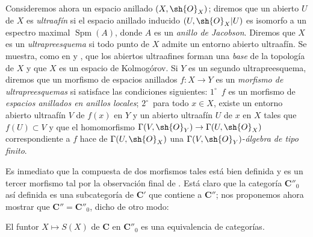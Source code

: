 
\begin{env}[10.9.5]
\label{IV.10.9.5}
Consideremos ahora un espacio anillado $(X,\sh{O}_X)$; diremos que un abierto $U$ de $X$ es \emph{ultraafín} si el espacio anillado inducido $(U,\sh{O}_X|U)$ es isomorfo a un espectro maximal $\operatorname{Spm}(A)$, donde $A$ es un \emph{anillo de Jacobson}.
Diremos que $X$ es un \emph{ultrapreesquema} si todo punto de $X$ admite un entorno abierto ultraafín.
Se muestra, como en  y , que los abiertos ultraafines forman una \emph{base} de la topología de $X$ y que $X$ es un espacio de Kolmogórov.
Si $Y$ es un segundo ultrapreesquema, diremos que un morfismo de espacios anillados $f:X\to Y$ es un \emph{morfismo de ultrapreesquemas} si satisface las condiciones siguientes: $1^\circ$~$f$ es un morfismo de \emph{espacios anillados en anillos locales}; $2^\circ$~para todo $x\in X$, existe un entorno abierto ultraafín $V$ de $f(x)$ en $Y$ y un abierto ultraafín $U$ de $x$ en $X$ tales que $f(U)\subset V$ y que el homomorfismo $\Gamma(V,\sh{O}_Y)\to\Gamma(U,\sh{O}_X)$ correspondiente a $f$ hace de $\Gamma(U,\sh{O}_X)$ una $\Gamma(V,\sh{O}_Y)$-\emph{álgebra de tipo finito}.

Es inmediato que la compuesta de dos morfismos tales está bien definida y es un tercer morfismo tal por la observación final de .
Está claro que la categoría $\boldsymbol{C}''_0$ así definida es una subcategoría de $\boldsymbol{C}'$ que contiene a $\boldsymbol{C}''$; nos proponemos ahora mostrar que $\boldsymbol{C}''=\boldsymbol{C}''_0$, dicho de otro modo:
\end{env}

\begin{proposition}[10.9.6]
\label{IV.10.9.6}
El funtor $X\mapsto S(X)$ de $\boldsymbol{C}$ en $\boldsymbol{C}''_0$ es una equivalencia de categorías.
\end{proposition}

